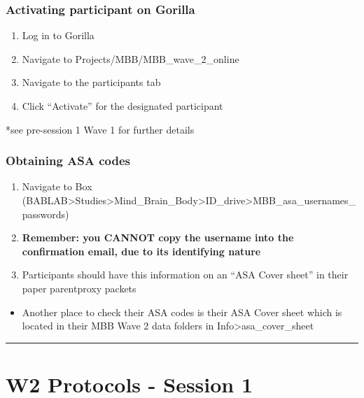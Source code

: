 \documentclass[
]{book}
\providecommand{\tightlist}{%
  \setlength{\itemsep}{0pt}\setlength{\parskip}{0pt}}
\begin{document}
\hypertarget{activating-participant-on-gorilla-1}{%
\subsubsection{Activating participant on Gorilla}\label{activating-participant-on-gorilla-1}}

\begin{enumerate}
\def\labelenumi{\arabic{enumi}.}
\tightlist
\item
  Log in to Gorilla
\item
  Navigate to Projects/MBB/MBB\_wave\_2\_online
\item
  Navigate to the participants tab
\item
  Click ``Activate'' for the designated participant
\end{enumerate}

*see pre-session 1 Wave 1 for further details

\hypertarget{obtaining-asa-codes}{%
\subsubsection{Obtaining ASA codes}\label{obtaining-asa-codes}}

\begin{enumerate}
\def\labelenumi{\arabic{enumi}.}
\tightlist
\item
  Navigate to Box (BABLAB\textgreater Studies\textgreater Mind\_Brain\_Body\textgreater ID\_drive\textgreater MBB\_asa\_usernames\_passwords)
\item
  \textbf{Remember: you CANNOT copy the username into the confirmation email, due to its identifying nature}
\item
  Participants should have this information on an ``ASA Cover sheet'' in their paper parentproxy packets
\end{enumerate}

\begin{itemize}
\tightlist
\item
  Another place to check their ASA codes is their ASA Cover sheet which is located in their MBB Wave 2 data folders in Info\textgreater asa\_cover\_sheet
\end{itemize}

\begin{center}\rule{0.5\linewidth}{0.5pt}\end{center}

\hypertarget{w2-protocols---session-1}{%
\section{W2 Protocols - Session 1}\label{w2-protocols---session-1}}
\end{document}
